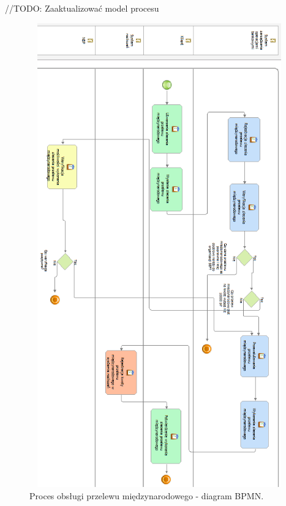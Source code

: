 //TODO: Zaaktualizować model procesu
\begin{figure}[h!tbp]
\begin{centering}
\includegraphics[width=12.5cm,height=20cm]{img/proces_operacja_przeleu_miedzynarodowego.png}
\caption[Proces obsługi przelewu międzynarodowego - diagram BPMN.]{Proces obsługi przelewu międzynarodowego - diagram BPMN.}\label{proces_operacja_przeleu_miedzynarodowego}
\end{centering}
\end{figure}

